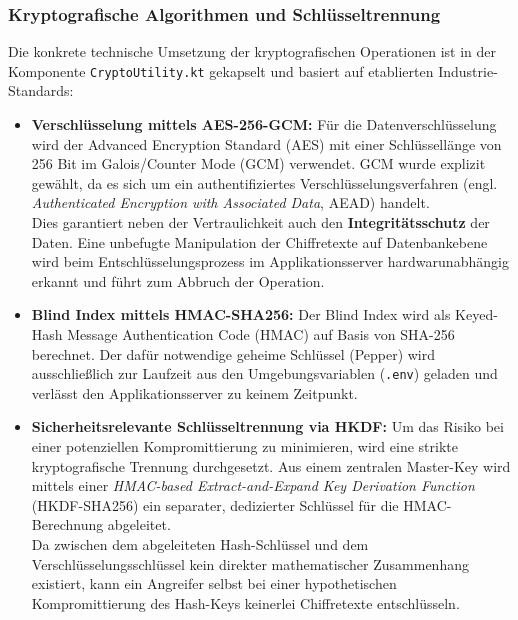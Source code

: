\subsubsection{Kryptografische Algorithmen und Schlüsseltrennung}

Die konkrete technische Umsetzung der kryptografischen Operationen ist in der Komponente \texttt{CryptoUtility.kt} gekapselt und basiert auf etablierten Industrie-Standards:

\begin{itemize}
    \item \textbf{Verschlüsselung mittels AES-256-GCM:} Für die Datenverschlüsselung wird der Advanced Encryption Standard (AES) mit einer Schlüssellänge von 256 Bit im Galois/Counter Mode (GCM) verwendet. GCM wurde explizit gewählt, da es sich um ein authentifiziertes Verschlüsselungsverfahren (engl. \textit{Authenticated Encryption with Associated Data}, AEAD) handelt. 
    \\Dies garantiert neben der Vertraulichkeit auch den \textbf{Integritätsschutz} der Daten. Eine unbefugte Manipulation der Chiffretexte auf Datenbankebene wird beim Entschlüsselungsprozess im Applikationsserver hardwarunabhängig erkannt und führt zum Abbruch der Operation.
    \item \textbf{Blind Index mittels HMAC-SHA256:} Der Blind Index wird als Keyed-Hash Message Authentication Code (HMAC) auf Basis von SHA-256 berechnet. Der dafür notwendige geheime Schlüssel (Pepper) wird ausschließlich zur Laufzeit aus den Umgebungsvariablen (\texttt{.env}) geladen und verlässt den Applikationsserver zu keinem Zeitpunkt.
    \item \textbf{Sicherheitsrelevante Schlüsseltrennung via HKDF:} Um das Risiko bei einer potenziellen Kompromittierung zu minimieren, wird eine strikte kryptografische Trennung durchgesetzt. Aus einem zentralen Master-Key wird mittels einer \textit{HMAC-based Extract-and-Expand Key Derivation Function} (HKDF-SHA256) ein separater, dedizierter Schlüssel für die HMAC-Berechnung abgeleitet. 
    \\Da zwischen dem abgeleiteten Hash-Schlüssel und dem Verschlüsselungsschlüssel kein direkter mathematischer Zusammenhang existiert, kann ein Angreifer selbst bei einer hypothetischen Kompromittierung des Hash-Keys keinerlei Chiffretexte entschlüsseln.
\end{itemize}


